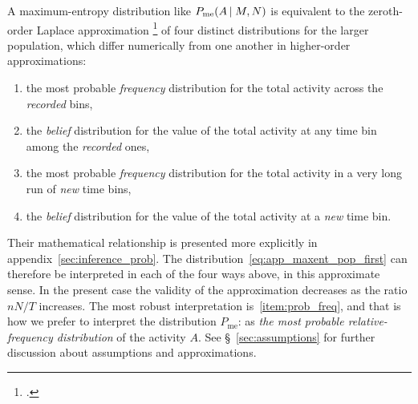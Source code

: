 \documentclass[\ifafour a4paper,12pt,\else a5paper,10pt,\fi%
onecolumn,oneside,article,%
british%
]{memoir}
\theoremstyle{remark}
\theoremstyle{innote}
\newcommand*{\citep}{\footcites}
\renewcommand*{\le}{\leqslant}%
\renewcommand*{\|}{\nonscript\,\vert\nonscript\;\mathopen{}}
\newcommand*{\sect}{\S}%
\newcommand*{\chap}{ch.}%
\newcommand*{\yAv}{A}
\newcommand*{\yFF}{F}
\newcommand*{\yA}{\yAv}%
\newcommand*{\yH}{\varIota}
\newcommand*{\ynuu}{\nu}
\newcommand*{\px}{P_{\text{me}}}
\begin{document}
A maximum-entropy distribution like $\px(\yA \| M, N)$ is equivalent to the
zeroth-order Laplace approximation
\citep[\chap~4]{debruijn1958_r1961}{tierneyetal1986,strawderman2000} of
four distinct distributions for the larger population, which differ
numerically from one another in higher-order approximations:
\begin{enumerate}[label=(\roman*)]
\item\label{item:prob_freq} the most probable \emph{frequency} distribution
  for the total activity across the \emph{recorded} bins, %
\item\label{item:prob_binin} the \emph{belief} distribution for the value
  of the total activity at any time bin among the \emph{recorded} ones,
\item\label{item:prob_longrun} the most probable \emph{frequency}
  distribution for the total activity in a very long run of \emph{new} time
  bins, %
\item\label{item:prob_binout} the \emph{belief} distribution for the value
  of the total activity at a \emph{new} time bin.
\end{enumerate}
Their mathematical relationship is presented more explicitly in
appendix~\ref{sec:inference_prob}. The
distribution~\eqref{eq:app_maxent_pop_first} can therefore be interpreted
in each of the four ways above, in this approximate sense. In the present
case the validity of the approximation decreases as the ratio $nN/T$
increases. The most robust interpretation is~\ref{item:prob_freq}, and that
is how we prefer to interpret the distribution $\px$: as \emph{the most
  probable relative-frequency distribution} of the activity $\yA$. See
\sect~\ref{sec:assumptions} for further discussion about assumptions and
approximations.
\end{document}
